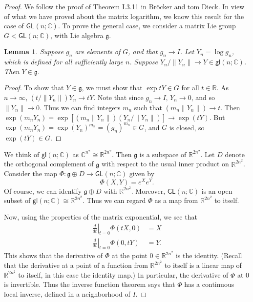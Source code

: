 \documentclass{amsbook}
\let \frak = \mathfrak
\theoremstyle{plain}
\newtheorem{lemma}[theorem]{Lemma}
\numberwithin{equation}{chapter}
\numberwithin{theorem}{chapter}
\begin{document}
\begin{proof}
We follow the proof of Theorem I.3.11 in Br\"{o}cker and tom Dieck. In view of
what we have proved about the matrix logarithm, we know this result for the
case of $\mathsf{GL}(n;\mathbb{C})$. To prove the general case, we consider a
matrix Lie group $G<\mathsf{GL}(n;\mathbb{C})$, with Lie algebra $\frak{g}$.

\begin{lemma}
Suppose $g_{n}$ are elements of $G$, and that $g_{n}\rightarrow I$. Let
$Y_{n}=\log g_{n}$, which is defined for all sufficiently large $n$. Suppose
$Y_{n}/\left\|  Y_{n}\right\|  \rightarrow Y\in\mathsf{gl}\left(
n;\mathbb{C}\right)  $. Then $Y\in\frak{g}$.
\end{lemma}

\begin{proof}
To show that $Y\in\frak{g}$, we must show that $\exp tY\in G$ for all
$t\in\mathbb{R}$. As $n\rightarrow\infty$, $\left(  t/\left\|  Y_{n}\right\|
\right)  Y_{n}\rightarrow tY$. Note that since $g_{n}\rightarrow I$,
$Y_{n}\rightarrow0$, and so $\left\|  Y_{n}\right\|  \rightarrow0$. Thus we
can find integers $m_{n}$ such that $\left(  m_{n}\left\|  Y_{n}\right\|
\right)  \rightarrow t$. Then $\exp\left(  m_{n}Y_{n}\right)  =\exp\left[
\left(  m_{n}\left\|  Y_{n}\right\|  \right)  \left(  Y_{n}/\left\|
Y_{n}\right\|  \right)  \right]  \rightarrow\exp\left(  tY\right)  $. But
$\exp\left(  m_{n}Y_{n}\right)  =\exp\left(  Y_{n}\right)  ^{m_{n}}=\left(
g_{n}\right)  ^{m_{n}}\in G$, and $G$ is closed, so $\exp\left(  tY\right)
\in G$.
\end{proof}

We think of $\mathsf{gl}\left(  n;\mathbb{C}\right)  $ as $\mathbb{C}^{n^{2}%
}\cong\mathbb{R}^{2n^{2}}$. Then $\frak{g}$ is a subspace of $\mathbb{R}%
^{2n^{2}}$. Let $D$ denote the orthogonal complement of $\frak{g}$ with
respect to the usual inner product on $\mathbb{R}^{2n^{2}}$. Consider the map
$\Phi:\frak{g}\oplus D\rightarrow\mathsf{GL}(n;\mathbb{C})$ given by
\[
\Phi\left(  X,Y\right)  =e^{X}e^{Y}\text{.}%
\]
Of course, we can identify $\frak{g}\oplus D$ with $\mathbb{R}^{2n^{2}}$.
Moreover, $\mathsf{GL}(n;\mathbb{C})$ is an open subset of $\mathsf{gl}\left(
n;\mathbb{C}\right)  \cong\mathbb{R}^{2n^{2}}$. Thus we can regard $\Phi$ as a
map from $\mathbb{R}^{2n^{2}}$ to itself.

Now, using the properties of the matrix exponential, we see that
\begin{align*}
\left.  \frac{d}{dt}\right|  _{t=0}\Phi\left(  tX,0\right)    & =X\\
\left.  \frac{d}{dt}\right|  _{t=0}\Phi\left(  0,tY\right)    & =Y\text{.}%
\end{align*}
This shows that the derivative of $\Phi$ at the point $0\in\mathbb{R}^{2n^{2}%
}$ is the identity. (Recall that the derivative at a point of a function from
$\mathbb{R}^{2n^{2}}$ to itself is a linear map of $\mathbb{R}^{2n^{2}}$ to
itself, in this case the identity map.) In particular, the derivative of
$\Phi$ at 0 is invertible. Thus the inverse function theorem says that $\Phi$
has a continuous local inverse, defined in a neighborhood of $I$.


\end{proof}
\end{document}
